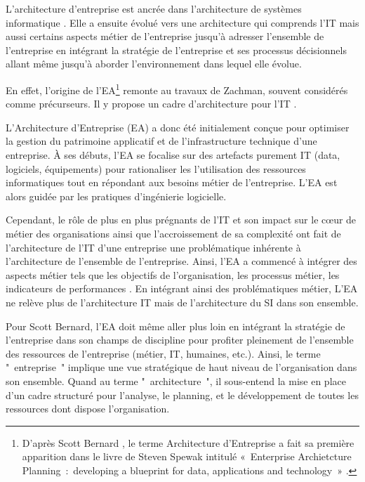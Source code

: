 L'architecture d'entreprise est ancrée dans l'architecture de systèmes 
informatique \cite{kappelman2008enterprise}. Elle a ensuite évolué vers une 
architecture qui comprends l'IT mais aussi certains aspects métier de l'entreprise 
\cite{winter2006essential}  jusqu'à adresser l'ensemble de l'entreprise en 
intégrant la stratégie de l'entreprise et ses processus décisionnels 
\cite{ross2006enterprise} allant même jusqu'à aborder l'environnement dans 
lequel elle évolue.

En effet, l'origine de l'EA\footnote{D'après Scott Bernard 
\cite{bernard2012introduction}, le terme Architecture d'Entreprise a fait sa 
première apparition dans le livre de Steven Spewak intitulé «~Enterprise 
Archietcture Planning~:~developing a blueprint for data, applications and 
technology~» \cite{spewak1993enterprise}.} remonte au travaux de Zachman, souvent 
considérés comme précurseurs. Il y propose un cadre d'architecture pour l'IT 
\cite{zachman1987framework}.

L'Architecture d'Entreprise (EA) a donc été initialement  conçue pour 
optimiser la gestion du patrimoine applicatif et de l'infrastructure technique d'une  
entreprise. À ses débuts, l'EA se focalise sur des artefacts purement IT (data, logiciels, équipements) pour 
rationaliser les l'utilisation des ressources informatiques 
\cite{winter2006essential} tout en répondant aux besoins métier de l'entreprise. 
L'EA est alors guidée par les pratiques d'ingénierie logicielle. 

Cependant, le rôle de plus en plus prégnants de l'IT et son impact sur le 
c\oe{}ur de métier des organisations ainsi que l'accroissement de sa complexité 
\cite{ranganathan2005enterprise} ont fait de l'architecture de l'IT d'une 
entreprise une problématique inhérente à l'architecture de l'ensemble de 
l'entreprise. Ainsi, l'EA a commencé à intégrer des aspects métier tels que les 
objectifs de l'organisation, les processus métier, les indicateurs de 
performances \cite{winter2006essential}. En intégrant ainsi des problématiques 
métier, L'EA ne relève plus de l'architecture IT mais de l'architecture du SI 
dans son ensemble.

Pour Scott Bernard, l'EA doit même aller plus loin en intégrant la stratégie de 
l'entreprise \cite{bernard2012introduction} dans son champs de discipline pour 
profiter pleinement de l'ensemble des ressources de l'entreprise (métier, IT, 
humaines, etc.). Ainsi, le terme "~entreprise~" implique une vue stratégique de 
haut niveau de l'organisation dans son ensemble. Quand au terme 
"~architecture~", il sous-entend la mise en place d'un cadre structuré pour 
l'analyse, le planning, et le développement de toutes les ressources dont 
dispose l'organisation. 

